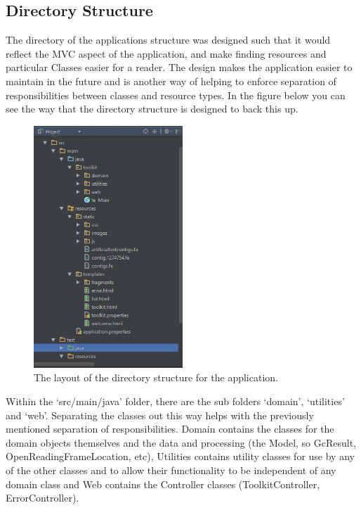 \subsection{Directory Structure}
The directory of the applications structure was designed such that it would reflect the MVC aspect of the application, and make finding resources and particular Classes easier for a reader. The design makes the application easier to maintain in the future and is another way of helping to enforce separation of responsibilities between classes and resource types. In the figure below you can see the way that the directory structure is designed to back this up.

\begin{figure}[H]
\centering
\includegraphics[width=0.5\textwidth]{images/directorystructure}
\caption{The layout of the directory structure for the application.}
\end{figure}

Within the `src/main/java' folder, there are the sub folders `domain', `utilities' and `web'. Separating the classes out this way helps with the previously mentioned separation of responsibilities. Domain contains the classes for the domain objects themselves and the data and processing (the Model, so GcResult, OpenReadingFrameLocation, etc), Utilities contains utility classes for use by any of the other classes and to allow their functionality to be independent of any domain class and Web contains the Controller classes (ToolkitController, ErrorController).

